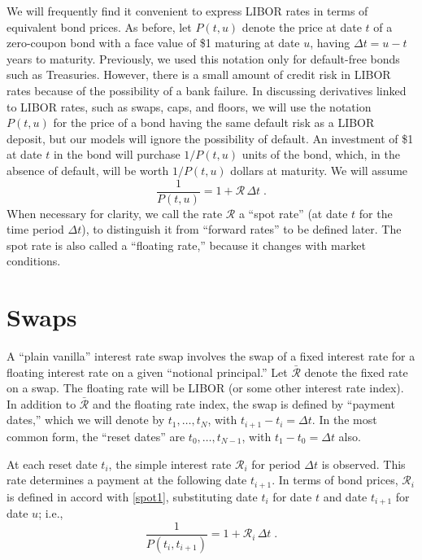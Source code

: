 We will frequently find it convenient to express LIBOR rates in terms of equivalent bond prices.  As before,
let $P(t,u)$ denote the price at date $t$ of a  zero-coupon bond with a face value of \$1 maturing at date $u$, having $\varDelta t = u-t$ years to maturity.  Previously, we used this notation only for default-free bonds such as Treasuries.  However, there is a small amount of credit risk in LIBOR rates because of the possibility of a bank failure.  In discussing derivatives linked to LIBOR rates, such as swaps, caps, and floors, we will use the notation $P(t,u)$ for the price of a bond having the same default risk as a LIBOR deposit, but our models will ignore the possibility of default.  An investment of \$1 at date $t$ in the bond will purchase $1/P(t,u)$ units of the bond, which, in the absence of default, will be worth $1/P(t,u)$ dollars at maturity.  We will assume
\begin{equation}\label{spot1}
\frac{1}{P(t,u)} = 1+\mathcal{R}\,\varDelta t\;.
\end{equation}
When necessary for clarity, we call the rate $\mathcal{R}$ a ``spot rate''  (at date $t$ for the time period $\varDelta t$), to distinguish it from ``forward rates'' to be defined later.  The spot rate is also called a ``floating rate,''  because it changes with market conditions.

\section{Swaps}\label{s_swaps}

A ``plain vanilla'' interest rate swap  involves the swap of a fixed interest rate for a floating interest rate on a given ``notional principal.''  Let $\bar{\mathcal{R}}$ denote the fixed rate on a swap.    The floating rate will be LIBOR (or some other interest rate index).  In addition to $\bar{\mathcal{R}}$ and the floating rate index, the swap is defined by ``payment dates,'' which we will denote by $t_1,\dots,t_N$, with $t_{i+1}-t_i=\varDelta t$.   In the most common form, the  ``reset dates'' are $t_0,\ldots,t_{N-1}$, with $t_1-t_0=\varDelta t$ also.  

At each reset date $t_i$, the simple interest rate $\mathcal{R}_i$ for period $\varDelta t$ is observed.  This rate determines a payment at the following date $t_{i+1}$.  In terms of bond prices, $\mathcal{R}_i$ is defined in accord with \eqref{spot1}, substituting date $t_i$ for date $t$ and date $t_{i+1}$ for date $u$; i.e.,
\begin{equation}\label{spot2}
\frac{1}{P(t_i,t_{i+1})} = 1+\mathcal{R}_i\,\varDelta t\;.
\end{equation}

